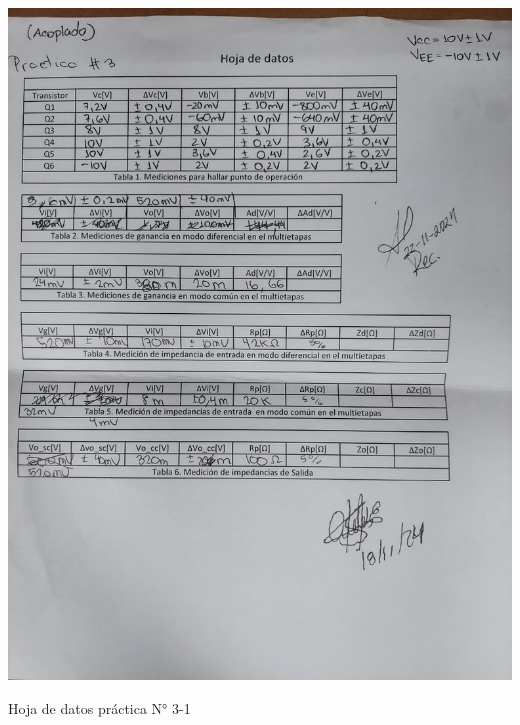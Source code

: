 \begin{ilustracion}[ht]
    \centering
    \includegraphics[width=1.0\textwidth]{src/images/p3/p3-hoja-de-datos.jpg}
    \caption{Hoja de datos práctica N° 3-1}
    \label{ilus:hoja-de-datos-p3-1}
\end{ilustracion}

